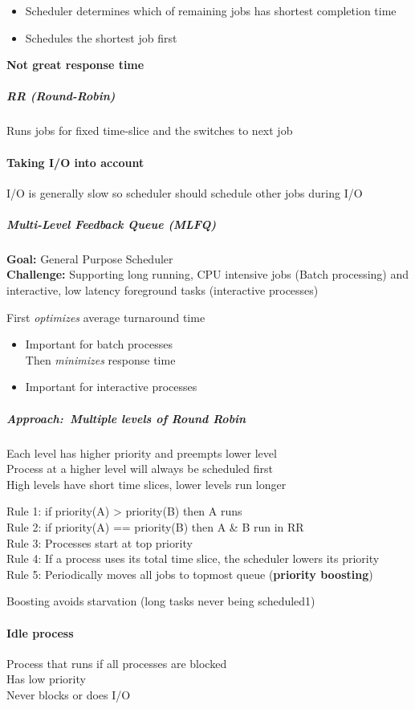 \documentclass[
]{article}
\providecommand{\tightlist}{%
  \setlength{\itemsep}{0pt}\setlength{\parskip}{0pt}}
\begin{document}
\begin{itemize}
\tightlist
\item
  Scheduler determines which of remaining jobs has shortest completion
  time
\item
  Schedules the shortest job first
\end{itemize}

\textbf{Not great response time}

\hypertarget{rr-round-robin}{%
\subparagraph{RR (Round-Robin)}\label{rr-round-robin}}

Runs jobs for fixed time-slice and the switches to next job

\hypertarget{taking-io-into-account}{%
\paragraph{Taking I/O into account}\label{taking-io-into-account}}

I/O is generally slow so scheduler should schedule other jobs during I/O

\hypertarget{multi-level-feedback-queue-mlfq}{%
\subparagraph{Multi-Level Feedback Queue
(MLFQ)}\label{multi-level-feedback-queue-mlfq}}

\textbf{Goal:} General Purpose Scheduler\\
\textbf{Challenge:} Supporting long running, CPU intensive jobs (Batch
processing) and interactive, low latency foreground tasks (interactive
processes)

First \emph{optimizes} average turnaround time

\begin{itemize}
\tightlist
\item
  Important for batch processes\\
  Then \emph{minimizes} response time
\item
  Important for interactive processes
\end{itemize}

\hypertarget{approach-multiple-levels-of-round-robin}{%
\subparagraph{Approach:~Multiple levels of Round
Robin}\label{approach-multiple-levels-of-round-robin}}

Each level has higher priority and preempts lower level\\
Process at a higher level will always be scheduled first\\
High levels have short time slices, lower levels run longer

Rule 1: if priority(A) \textgreater{} priority(B) then A runs\\
Rule 2: if priority(A) == priority(B) then A \& B run in RR\\
Rule 3: Processes start at top priority\\
Rule 4: If a process uses its total time slice, the scheduler lowers its
priority\\
Rule 5: Periodically moves all jobs to topmost queue (\textbf{priority
boosting})

Boosting avoids starvation (long tasks never being scheduled1)

\hypertarget{idle-process}{%
\paragraph{Idle process}\label{idle-process}}

Process that runs if all processes are blocked\\
Has low priority\\
Never blocks or does I/O
\end{document}
